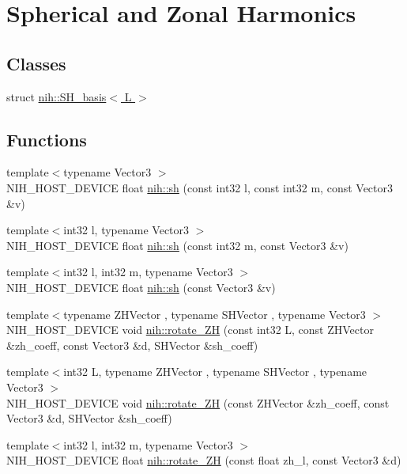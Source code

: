 \hypertarget{group__spherical}{
\section{\-Spherical and \-Zonal \-Harmonics}
\label{group__spherical}
}
\subsection*{\-Classes}
\begin{DoxyCompactItemize}
\item 
struct \hyperlink{structnih_1_1_s_h__basis}{nih\-::\-S\-H\-\_\-basis$<$ L $>$}
\end{DoxyCompactItemize}
\subsection*{\-Functions}
\begin{DoxyCompactItemize}
\item 
{\footnotesize template$<$typename Vector3 $>$ }\\\-N\-I\-H\-\_\-\-H\-O\-S\-T\-\_\-\-D\-E\-V\-I\-C\-E float \hyperlink{group__spherical_ga61b3dccbdbb3265ced8cfefc49c4f96c}{nih\-::sh} (const int32 l, const int32 m, const \-Vector3 \&v)
\item 
{\footnotesize template$<$int32 l, typename Vector3 $>$ }\\\-N\-I\-H\-\_\-\-H\-O\-S\-T\-\_\-\-D\-E\-V\-I\-C\-E float \hyperlink{group__spherical_ga84c13afac74205bed1f5f3a382088394}{nih\-::sh} (const int32 m, const \-Vector3 \&v)
\item 
{\footnotesize template$<$int32 l, int32 m, typename Vector3 $>$ }\\\-N\-I\-H\-\_\-\-H\-O\-S\-T\-\_\-\-D\-E\-V\-I\-C\-E float \hyperlink{group__spherical_ga093407ba5202540f5ca6cc3da2567970}{nih\-::sh} (const \-Vector3 \&v)
\item 
{\footnotesize template$<$typename Z\-H\-Vector , typename S\-H\-Vector , typename Vector3 $>$ }\\\-N\-I\-H\-\_\-\-H\-O\-S\-T\-\_\-\-D\-E\-V\-I\-C\-E void \hyperlink{group__spherical_gac4367786c521d9b0e54b08dd27bcc391}{nih\-::rotate\-\_\-\-Z\-H} (const int32 \-L, const \-Z\-H\-Vector \&zh\-\_\-coeff, const \-Vector3 \&d, \-S\-H\-Vector \&sh\-\_\-coeff)
\item 
{\footnotesize template$<$int32 \-L, typename Z\-H\-Vector , typename S\-H\-Vector , typename Vector3 $>$ }\\\-N\-I\-H\-\_\-\-H\-O\-S\-T\-\_\-\-D\-E\-V\-I\-C\-E void \hyperlink{group__spherical_gad3026df527a2ed22cead3594bdd25b19}{nih\-::rotate\-\_\-\-Z\-H} (const \-Z\-H\-Vector \&zh\-\_\-coeff, const \-Vector3 \&d, \-S\-H\-Vector \&sh\-\_\-coeff)
\item 
{\footnotesize template$<$int32 l, int32 m, typename Vector3 $>$ }\\\-N\-I\-H\-\_\-\-H\-O\-S\-T\-\_\-\-D\-E\-V\-I\-C\-E float \hyperlink{group__spherical_ga0cea7b5e2aa00742a2e8d00af322edf3}{nih\-::rotate\-\_\-\-Z\-H} (const float zh\-\_\-l, const \-Vector3 \&d)
\end{DoxyCompactItemize}


